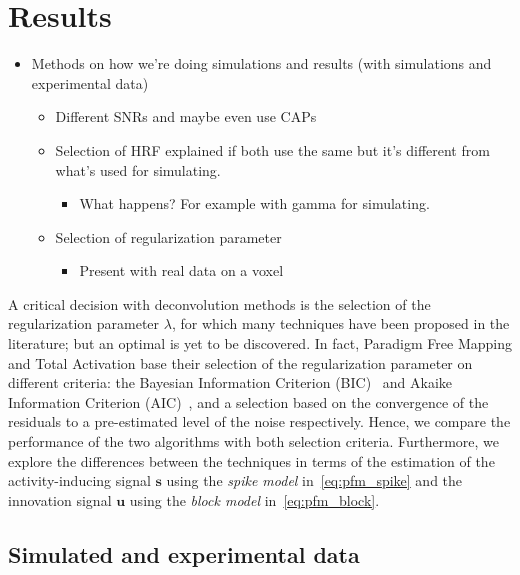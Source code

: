 \section{Results}

\begin{itemize}
    \item Methods on how we're doing simulations and results (with simulations and experimental data)
    \begin{itemize}
        \item Different SNRs and maybe even use CAPs
        \item Selection of HRF explained if both use the same but it's different from what's used for simulating.
        \begin{itemize}
            \item What happens? For example with gamma for simulating.
        \end{itemize}
        \item Selection of regularization parameter
        \begin{itemize}
            \item Present with real data on a voxel
        \end{itemize}
    \end{itemize}
\end{itemize}

A critical decision with deconvolution methods is the selection of the regularization parameter \(\lambda\), for which many techniques have been proposed in the literature; but an optimal is yet to be discovered. In fact, Paradigm Free Mapping and Total Activation base their selection of the regularization parameter on different criteria: the Bayesian Information Criterion (BIC)~\cite{schwarz1978estimating} and Akaike Information Criterion (AIC)~\cite{akaike1998information}, and a selection based on the convergence of the residuals to a pre-estimated level of the noise respectively. Hence, we compare the performance of the two algorithms with both selection criteria. Furthermore, we explore the differences between the techniques in terms of the estimation of the activity-inducing signal \(\mathbf{s}\) using the \textit{spike model} in~\eqref{eq:pfm_spike} and the innovation signal \(\mathbf{u}\) using the \textit{block model} in~\eqref{eq:pfm_block}.

\subsection{Simulated and experimental data}

